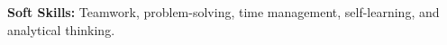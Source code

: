 \small{\textbf{Soft Skills:} Teamwork, problem-solving, time management, self-learning, and analytical thinking.}
